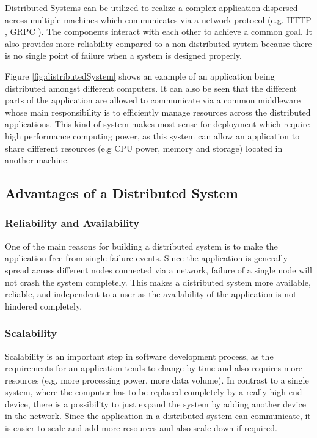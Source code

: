     \par
    Distributed Systems can be utilized to realize a complex application dispersed across
    multiple machines which communicates via a network protocol (e.g. HTTP \cite{HTTP}, 
    GRPC \cite{grpc}). The 
    components interact with each other to achieve a common goal. It also provides
    more reliability compared to a non-distributed system because there is no single point
    of failure when a system is designed properly. 

    \par
    Figure \ref{fig:distributedSystem} shows an example of an application being 
    distributed amongst different computers. It can also be seen that the different parts of the application are allowed
    to communicate via a common middleware whose main responsibility is to
    efficiently manage resources across the distributed applications. This kind of system
    makes most sense for deployment which require high performance computing power, as this system can allow an application to share different
    resources (e.g CPU power, memory and storage) located in another machine.



    
        
    \subsection{Advantages of a Distributed System} 
        \subsubsection{Reliability and Availability}
        One of the main reasons for building a distributed system is to make the application free from single failure events.
        Since the application is generally spread across different nodes connected via a network, failure of a single node will not 
        crash the system completely. This makes a distributed system more available, reliable, and independent to a user as the availability
        of the application is not hindered completely.
        
        \subsubsection{Scalability}
        Scalability is an important step in software development process, as the requirements for an application tends to change by time and also requires more resources
        (e.g. more processing power, more data volume). 
        In contrast to a single system, where the computer 
        has to be replaced completely by a really high end device, there is a possibility to just expand the system by adding another device in the network.
        Since the application in a distributed system can communicate, it is easier to scale and add more resources and 
        also scale down if required. 
    
